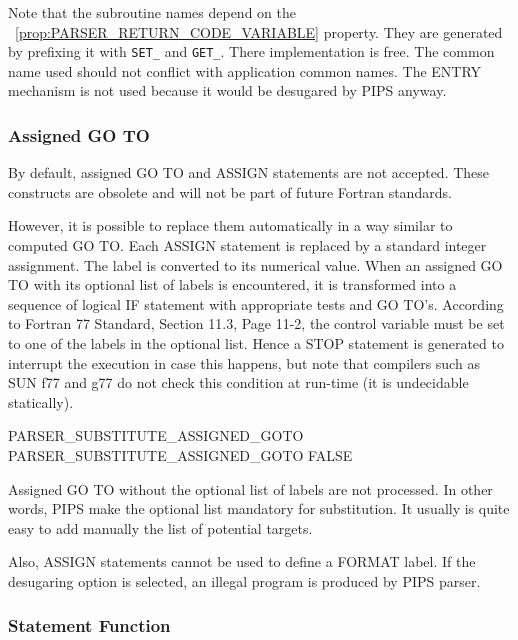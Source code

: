 \documentclass[a4paper]{report}
\newcommand{\PipsPropRef}[1]{\texttt{\detokenize{#1}}~\ref{prop:#1}}
\begin{document}
Note that the subroutine names depend on the
\PipsPropRef{PARSER_RETURN_CODE_VARIABLE} property. They are generated by
prefixing it with \verb/SET_/ and \verb/GET_/. There implementation is
free. The common name used should not conflict with application common
names. The ENTRY mechanism is not used because it would be desugared by
PIPS anyway.

\subsubsection*{Assigned GO TO}

By default, assigned GO TO and ASSIGN statements are not accepted.
These constructs are obsolete and will not be part of future Fortran
standards.

However, it is possible to replace them automatically in a way similar to
computed GO TO. Each ASSIGN statement is replaced by a standard integer
assignment. The label is converted to its numerical value. When an
assigned GO TO with its optional list of labels is encountered, it is
transformed into a sequence of logical IF statement with appropriate tests
and GO TO's. According to Fortran 77 Standard, Section 11.3, Page 11-2,
the control variable must be set to one of the labels in the optional
list. Hence a STOP statement is generated to interrupt the execution in case
this happens, but note that compilers such as SUN f77 and g77 do not check
this condition at run-time (it is undecidable statically).

\begin{PipsProp}{PARSER_SUBSTITUTE_ASSIGNED_GOTO}
PARSER_SUBSTITUTE_ASSIGNED_GOTO FALSE
\end{PipsProp}

Assigned GO TO without the optional list of labels are not processed. In
other words, PIPS make the optional list mandatory for substitution. It
usually is quite easy to add manually the list of potential targets.

Also, ASSIGN statements cannot be used to define a FORMAT label. If the
desugaring option is selected, an illegal program is produced by PIPS
parser.

\subsubsection*{Statement Function}
\end{document}
